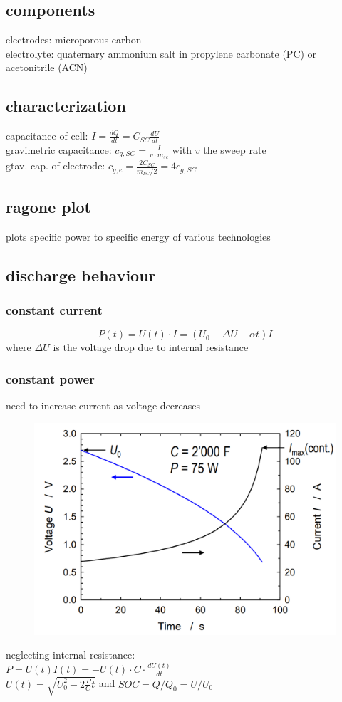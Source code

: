 \documentclass[a4paper,10pt,landscape]{scrartcl}
\begin{document}
\begin{multicols*}{3}
\subsection{components}
electrodes: microporous carbon \\
electrolyte: quaternary ammonium salt in propylene
carbonate (PC) or acetonitrile (ACN)

\subsection{characterization}
capacitance of cell: $I=\frac{dQ}{dt}=C_{SC}\frac{dU}{dt}$ \\
gravimetric capacitance: $c_{g,SC}=\frac{I}{v\cdot m_{sc}}$ with $v$ the sweep rate\\
gtav. cap. of electrode: $c_{g,e}=\frac{2C_{SC}}{m_{SC}/2}=4c_{g,SC}$

\subsection{ragone plot}
plots specific power to specific energy of various technologies

\subsection{discharge behaviour}
\subsubsection{constant current}
$$P(t)=U(t)\cdot I=(U_0-\Delta U -\alpha t)I$$
where $\Delta U$ is the voltage drop due to internal resistance
\subsubsection{constant power}
need to increase current as voltage decreases \\
\begin{figure}[H]
    \centering
    \includegraphics[width=0.5\linewidth]{src/const_power.png}
\end{figure}
neglecting internal resistance: \\
$P=U(t)I(t)=-U(t)\cdot C\cdot \frac{dU(t)}{dt}$ \\
$U(t)=\sqrt{U_0^2-2\frac{P}{C}t}$ and $SOC=Q/Q_0=U/U_0$

\end{multicols*}
\end{document}
